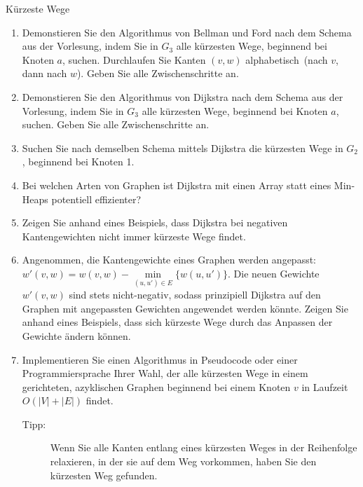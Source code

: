 \documentclass[11pt,a4paper]{article}
\begin{document}
\begin{aufgabe}{3}{Kürzeste Wege}
\begin{figure}[h!]
    \end{figure}
    \FloatBarrier
    \begin{enumerate}
        \item Demonstieren Sie den Algorithmus von Bellman und Ford nach dem Schema aus der Vorlesung, indem Sie in $G_3$ alle kürzesten Wege, beginnend bei Knoten $a$, suchen.
        Durchlaufen Sie Kanten $(v, w)$ alphabetisch~(nach $v$, dann nach $w$).
        Geben Sie alle Zwischenschritte an.
        \item Demonstieren Sie den Algorithmus von Dijkstra nach dem Schema aus der Vorlesung, indem Sie in $G_3$ alle kürzesten Wege, beginnend bei Knoten $a$, suchen.
        Geben Sie alle Zwischenschritte an.
        \item Suchen Sie nach demselben Schema mittels Dijkstra die kürzesten Wege in $G_2$, beginnend bei Knoten 1.
        \item Bei welchen Arten von Graphen ist Dijkstra mit einen Array statt eines Min-Heaps potentiell effizienter?
        \item Zeigen Sie anhand eines Beispiels, dass Dijkstra bei negativen Kantengewichten nicht immer kürzeste Wege findet.
        \item Angenommen, die Kantengewichte eines Graphen werden angepasst: $w'(v, w) = w(v, w) - \min\limits_{(u, u') \in E} \{w(u, u') \}$.
        Die neuen Gewichte $w'(v, w)$ sind stets nicht-negativ, sodass prinzipiell Dijkstra auf den Graphen mit angepassten Gewichten angewendet werden könnte.
        Zeigen Sie anhand eines Beispiels, dass sich kürzeste Wege durch das Anpassen der Gewichte ändern können.
        \item Implementieren Sie einen Algorithmus in Pseudocode oder einer Programmiersprache Ihrer Wahl, der alle kürzesten Wege in einem gerichteten, azyklischen Graphen beginnend bei einem Knoten $v$ in Laufzeit $O(|V| + |E|)$ findet.
        \begin{description}
            \item[Tipp:] Wenn Sie alle Kanten entlang eines kürzesten Weges in der Reihenfolge relaxieren, in der sie auf dem Weg vorkommen, haben Sie den kürzesten Weg gefunden.
        \end{description}
    \end{enumerate}
\end{aufgabe}
\end{document}
